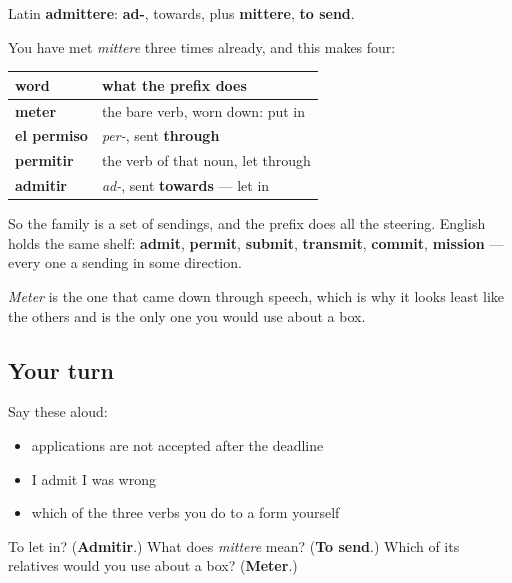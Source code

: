 \begin{cousinweb}
Latin \textbf{admittere}: \textbf{ad-}, towards, plus \textbf{mittere}, \textbf{to send}.

You have met \emph{mittere} three times already, and this makes four:

\noindent
\begin{tabularx}{\linewidth}{@{}>{\raggedright\arraybackslash}X>{\raggedright\arraybackslash}X@{}}
\toprule
\textbf{word} & \textbf{what the prefix does} \\
\midrule
\textbf{meter} & the bare verb, worn down: put in \\
\textbf{el permiso} & \emph{per-}, sent \textbf{through} \\
\textbf{permitir} & the verb of that noun, let through \\
\textbf{admitir} & \emph{ad-}, sent \textbf{towards} — let in \\
\bottomrule
\end{tabularx}

So the family is a set of sendings, and the prefix does all the steering. English holds the same shelf: \textbf{admit}, \textbf{permit}, \textbf{submit}, \textbf{transmit}, \textbf{commit}, \textbf{mission} — every one a sending in some direction.

\emph{Meter} is the one that came down through speech, which is why it looks least like the others and is the only one you would use about a box.
\end{cousinweb}

\subsection*{Your turn}
Say these aloud:

\begin{itemize}
\raggedright
  \item applications are not accepted after the deadline
  \item I admit I was wrong
  \item which of the three verbs you do to a form yourself
\end{itemize}

\begin{tcolorbox}[breakable,colback=teal!4,colframe=teal!35!black,title={Before you move on}]
To let in? (\textbf{Admitir}.) What does \emph{mittere} mean? (\textbf{To send}.) Which of its relatives would you use about a box? (\textbf{Meter}.)
\end{tcolorbox}
